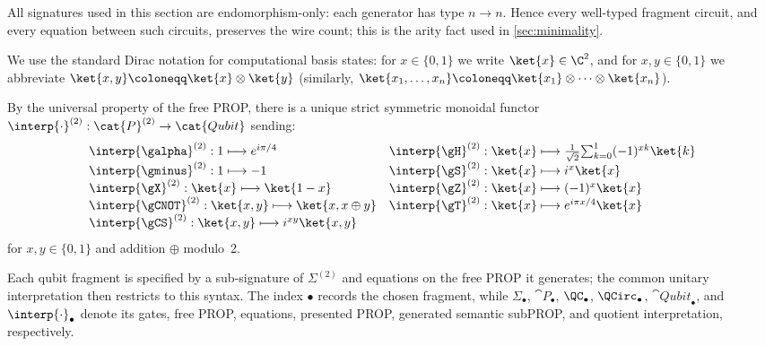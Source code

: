 \begin{remark}\label{rem:arity-preservation}
All signatures used in this section are endomorphism-only: each generator has type \(n\to n\).
Hence every well-typed fragment circuit, and every equation between such circuits, preserves the
wire count; this is the arity fact used in \cref{sec:minimality}.
\end{remark}

We use the standard Dirac notation for computational basis states: for \(x\in\{0,1\}\) we write \(\ket{x}\in\C^2\),
and for \(x,y\in\{0,1\}\) we abbreviate \(\ket{x,y}\coloneqq \ket{x}\otimes\ket{y}\) (similarly,
\(\ket{x_1,\ldots,x_n}\coloneqq \ket{x_1}\otimes\cdots\otimes\ket{x_n}\)).

By the universal property of the free PROP, there is a unique strict
symmetric monoidal functor
\(
  \interp{\cdot}^{(2)}:\cat{P}^{(2)}\to\cat{Qubit}
\)
sending:
\begin{equation*}
\begin{array}{l l}
 \interp{\galpha}^{(2)} : 1\longmapsto e^{i\pi/4} &
 \interp{\gH}^{(2)} : \ket{x}\longmapsto
     \tfrac1{\sqrt2}\!\sum_{k=0}^1(-1)^{xk}\ket{k}\\
 \interp{\gminus}^{(2)} : 1\longmapsto -1 &
 \interp{\gS}^{(2)} : \ket{x}\longmapsto i^x\ket{x} \\
 \interp{\gX}^{(2)} : \ket{x}\longmapsto\ket{1-x} &
 \interp{\gZ}^{(2)} : \ket{x}\longmapsto(-1)^x\ket{x} \\
 \interp{\gCNOT}^{(2)} : \ket{x,y}\longmapsto\ket{x,x\oplus y} &
 \interp{\gT}^{(2)} : \ket{x}\longmapsto e^{i\pi x/4}\ket{x} \\
 \interp{\gCS}^{(2)} : \ket{x,y}\longmapsto i^{xy}\ket{x,y}
\end{array}
\end{equation*}
for \(x,y\in\{0,1\}\) and addition \(\oplus\) modulo~2.

Each qubit fragment is specified by a sub-signature of \(\Sigma^{(2)}\) and equations on the free
PROP it generates; the common unitary interpretation then restricts to this syntax.  The index
\(\bullet\) records the chosen fragment, while \(\Sigma_\bullet\), \(\cat{P}_\bullet\),
\(\QC_\bullet\), \(\QCirc_\bullet\), \(\cat{Qubit}_\bullet\), and
\(\interp{\cdot}_\bullet\) denote its gates, free PROP, equations, presented PROP, generated
semantic subPROP, and quotient interpretation, respectively.


